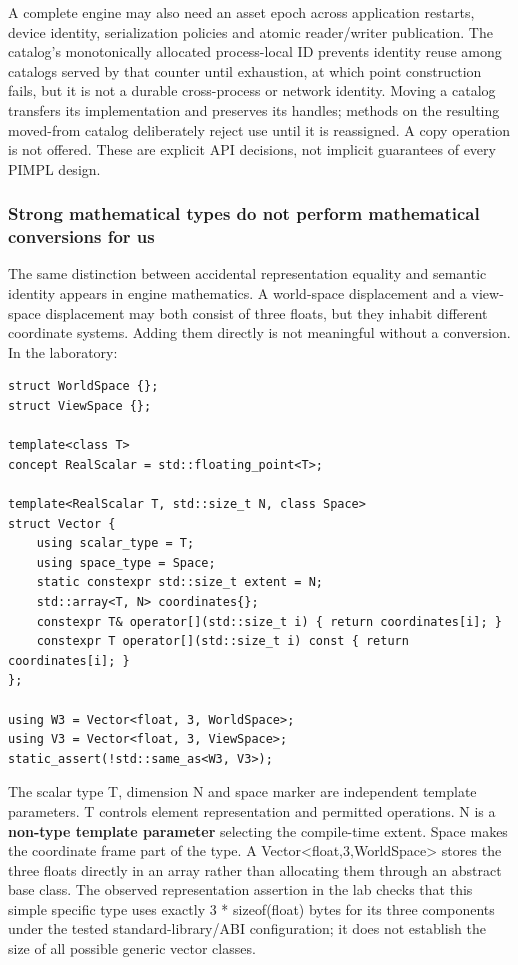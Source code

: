 A complete engine may also need an asset epoch across application restarts, device identity, serialization policies and atomic reader/writer publication. The catalog's monotonically allocated process-local ID prevents identity reuse among catalogs served by that counter until exhaustion, at which point construction fails, but it is not a durable cross-process or network identity. Moving a catalog transfers its implementation and preserves its handles; methods on the resulting moved-from catalog deliberately reject use until it is reassigned. A copy operation is not offered. These are explicit API decisions, not implicit guarantees of every PIMPL design.

\subsubsection{Strong mathematical types do not perform mathematical conversions for us}\label{strong-mathematical-types-do-not-perform-mathematical-conversions-for-us}

The same distinction between accidental representation equality and semantic identity appears in engine mathematics. A world-space displacement and a view-space displacement may both consist of three floats, but they inhabit different coordinate systems. Adding them directly is not meaningful without a conversion. In the laboratory:

\begin{verbatim}
struct WorldSpace {};
struct ViewSpace {};

template<class T>
concept RealScalar = std::floating_point<T>;

template<RealScalar T, std::size_t N, class Space>
struct Vector {
    using scalar_type = T;
    using space_type = Space;
    static constexpr std::size_t extent = N;
    std::array<T, N> coordinates{};
    constexpr T& operator[](std::size_t i) { return coordinates[i]; }
    constexpr T operator[](std::size_t i) const { return coordinates[i]; }
};

using W3 = Vector<float, 3, WorldSpace>;
using V3 = Vector<float, 3, ViewSpace>;
static_assert(!std::same_as<W3, V3>);
\end{verbatim}

The scalar type T, dimension N and space marker are independent template parameters. T controls element representation and permitted operations. N is a \textbf{non-type template parameter} selecting the compile-time extent. Space makes the coordinate frame part of the type. A Vector\textless float,3,WorldSpace\textgreater{} stores the three floats directly in an array rather than allocating them through an abstract base class. The observed representation assertion in the lab checks that this simple specific type uses exactly 3 * sizeof(float) bytes for its three components under the tested standard-library/ABI configuration; it does not establish the size of all possible generic vector classes.

